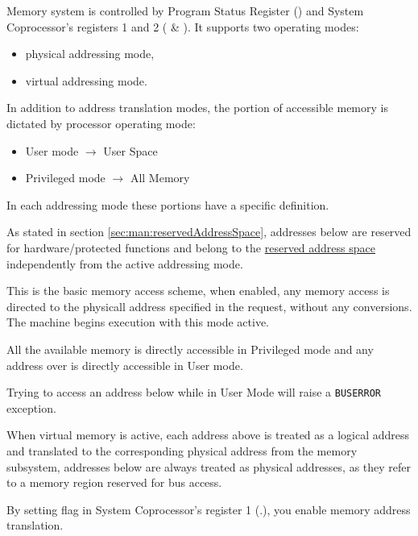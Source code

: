 \label{sec:man:memory}
Memory system is controlled by Program Status Register () and System Coprocessor's registers 1 and 2 ( \& ). It supports two operating modes:

\begin{itemize}
\item physical addressing mode, 
\item virtual addressing mode.
\end{itemize}

In addition to address translation modes, the portion of accessible memory is dictated by processor operating mode:

\begin{itemize}
\item User mode $\rightarrow$ User Space
\item Privileged mode $\rightarrow$ All Memory
\end{itemize}

In each addressing mode these portions have a specific definition.

As stated in section \ref{sec:man:reservedAddressSpace}, addresses below  are reserved for hardware/protected functions and belong to the \uline{reserved address space} independently from the active addressing mode.

This is the basic memory access scheme, when enabled, any memory access is directed to the physicall address specified in the request, without any conversions.
The machine begins execution with this mode active.

All the available memory is directly accessible in Privileged mode and any address over  is directly accessible in User mode.


Trying to access an address below  while in User Mode will raise a \texttt{BUSERROR} exception.

\label{sec:man:virtualMemory}
When virtual memory is active, each address above  is treated as a logical address and translated to the corresponding physical address from the memory subsystem, addresses below  are always treated as physical addresses, as they refer to a memory region reserved for bus access.

By setting  flag in System Coprocessor's register 1 (.), you enable memory address translation.


